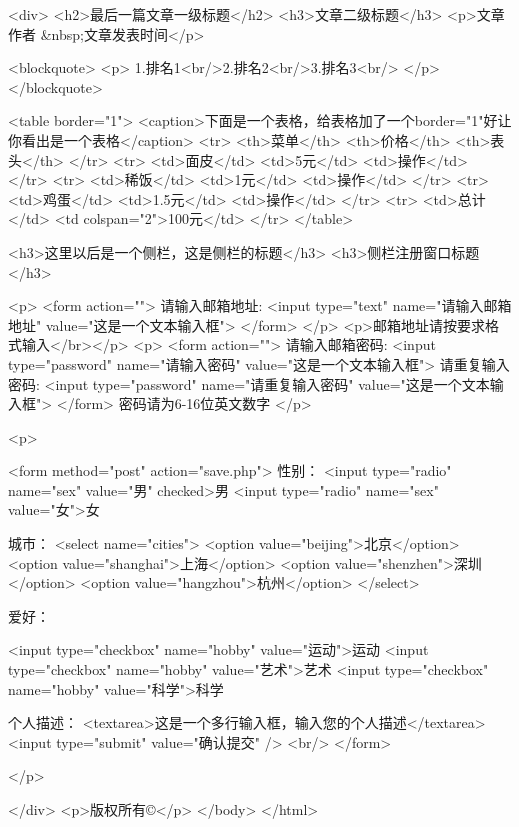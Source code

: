 <div>
<h2>最后一篇文章一级标题</h2>
<h3>文章二级标题</h3>
<p>文章作者 &nbsp;文章发表时间</p>

<blockquote>
<p> 1.排名1<br/>2.排名2<br/>3.排名3<br/> </p>
</blockquote>



<table border="1">
<caption>下面是一个表格，给表格加了一个border="1"好让你看出是一个表格</caption>
<tr>
<th>菜单</th>
<th>价格</th>
<th>表头</th>
</tr>
<tr>
<td>面皮</td>
<td>5元</td>
<td>操作</td>
</tr>
<tr>
<td>稀饭</td>
<td>1元</td>
<td>操作</td>
</tr>
<tr>
<td>鸡蛋</td>
<td>1.5元</td>
<td>操作</td>
</tr>
<tr>
<td>总计</td>
<td colspan="2">100元</td>
</tr>
</table>


<h3>这里以后是一个侧栏，这是侧栏的标题</h3>
<h3>侧栏注册窗口标题</h3>


<p>
<form action="">
请输入邮箱地址:
<input type="text" name="请输入邮箱地址" value="这是一个文本输入框">
</form>
</p>
<p>邮箱地址请按要求格式输入</br></p>
<p>
<form action="">
请输入邮箱密码:
<input type="password" name="请输入密码"  value="这是一个文本输入框">
请重复输入密码:
<input type="password" name="请重复输入密码" value="这是一个文本输入框">
</form>
密码请为6-16位英文数字
</p>


<p>


<form method="post" action="save.php">
性别：
<input type="radio" name="sex" value="男" checked>男
<input type="radio" name="sex" value="女">女

城市：
<select name="cities">
<option value="beijing">北京</option>
<option value="shanghai">上海</option>
<option value="shenzhen">深圳</option>
<option value="hangzhou">杭州</option>
</select>

爱好：

<input type="checkbox" name="hobby" value="运动">运动
<input type="checkbox" name="hobby" value="艺术">艺术 
<input type="checkbox" name="hobby" value="科学">科学 

个人描述：
<textarea>这是一个多行输入框，输入您的个人描述</textarea>
<input type="submit"  value="确认提交" />
<br/>
</form> 


</p>

</div>
<p>版权所有©</p>
</body>
</html>